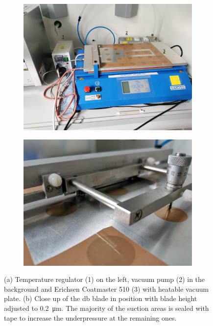 \documentclass[a4paper]{article}
\begin{document}
\begin{figure}
	\centering
	\begin{subfigure}{.49\textwidth}
		\centering
		\includegraphics[width=.99\textwidth]{Pics/erichsen1.png}
		\caption{}
	\end{subfigure}
	\begin{subfigure}{.49\textwidth}
		\centering
		\includegraphics[width=.99\textwidth]{Pics/erichsendb1.png}
		\caption{}
	\end{subfigure}
	\caption{
		(a)
		Temperature regulator (1) on the left,
		vacuum pump (2) in the background and 
		Erichsen Coatmaster 510 (3) with heatable vacuum plate.
        (b) Close up of the \gls{db} blade in position with blade height adjusted to \SI{0.2}{\micro\meter}.
		The majority of the suction areas is sealed with tape to increase the underpressure at the remaining ones.
	}
	\label{fig:eric}
\end{figure}
\end{document}
